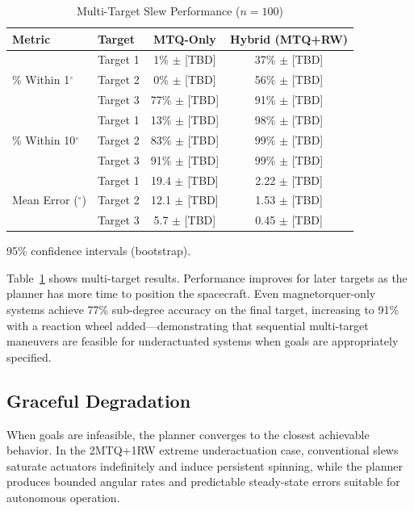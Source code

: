 \documentclass[conference]{IEEEtran}
\begin{document}
\begin{table}[t]
    \centering
    \caption{Multi-Target Slew Performance ($n=100$)}
    \label{tab:mc_multi}
    \begin{tabular}{llcc}
        \toprule
        Metric & Target & MTQ-Only & Hybrid (MTQ+RW) \\
        \midrule
        \multirow{3}{*}{\% Within 1$^\circ$}
            & Target 1 & 1\% $\pm$ [TBD] & 37\% $\pm$ [TBD] \\
            & Target 2 & 0\% $\pm$ [TBD] & 56\% $\pm$ [TBD] \\
            & Target 3 & 77\% $\pm$ [TBD] & 91\% $\pm$ [TBD] \\
        \midrule
        \multirow{3}{*}{\% Within 10$^\circ$}
            & Target 1 & 13\% $\pm$ [TBD] & 98\% $\pm$ [TBD] \\
            & Target 2 & 83\% $\pm$ [TBD] & 99\% $\pm$ [TBD] \\
            & Target 3 & 91\% $\pm$ [TBD] & 99\% $\pm$ [TBD] \\
        \midrule
        \multirow{3}{*}{Mean Error ($^\circ$)}
            & Target 1 & 19.4 $\pm$ [TBD] & 2.22 $\pm$ [TBD] \\
            & Target 2 & 12.1 $\pm$ [TBD] & 1.53 $\pm$ [TBD] \\
            & Target 3 & 5.7 $\pm$ [TBD] & 0.45 $\pm$ [TBD] \\
        \bottomrule
    \end{tabular}
    \begin{flushleft}
    \small 95\% confidence intervals (bootstrap).
    \end{flushleft}
\end{table}

Table~\ref{tab:mc_multi} shows multi-target results. Performance improves for later targets as the planner has more time to position the spacecraft. Even magnetorquer-only systems achieve 77\% sub-degree accuracy on the final target, increasing to 91\% with a reaction wheel added---demonstrating that sequential multi-target maneuvers are feasible for underactuated systems when goals are appropriately specified.

\subsection{Graceful Degradation}\label{subsec:graceful_degradation}

When goals are infeasible, the planner converges to the closest achievable behavior. In the 2MTQ+1RW extreme underactuation case, conventional slews saturate actuators indefinitely and induce persistent spinning, while the planner produces bounded angular rates and predictable steady-state errors suitable for autonomous operation.
\end{document}
